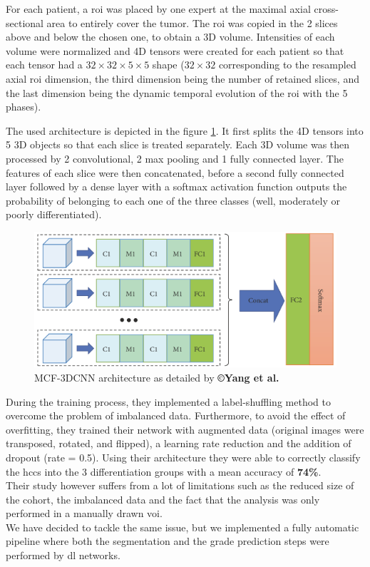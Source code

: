For each patient, a \ac{roi} was placed by one expert at the maximal axial
cross-sectional area to entirely cover the tumor. The \ac{roi} was
copied in the 2 slices above and below the chosen one, to obtain a 3D
volume. Intensities of each volume were normalized and 4D tensors were
created for each patient so that each tensor had a $ 32\times32\times5\times5 $ shape
($ 32\times32 $ corresponding to the resampled axial \ac{roi} dimension, the third
dimension being the number of retained slices, and the last dimension being the
dynamic temporal evolution of the \ac{roi} with the 5 phases).

The used architecture is depicted in the figure \ref{fig:Yang2019_Figure2_MCF-3DCNN}. It first splits the 4D
tensors into 5 3D objects so that each slice is treated separately. Each
3D volume was then processed by 2 convolutional, 2 max pooling and 1
fully connected layer. The features of each slice were then
concatenated, before a second fully connected layer followed by a dense
layer with a softmax activation function outputs the probability of
belonging to each one of the three classes (well, moderately or poorly differentiated).

\begin{figure}[th!]
\centering
\includegraphics[width=0.7\linewidth]{../HistologicalGradePrediction/images/Yang2019_Fig2}
\caption{MCF-3DCNN architecture as detailed by \textbf{©Yang et al. \cite{Yang2019}}}
\label{fig:Yang2019_Figure2_MCF-3DCNN}
\end{figure}


During the training process, they implemented a label-shuffling method
to overcome the problem of imbalanced data. Furthermore, to avoid the
effect of overfitting, they trained their network with augmented data
(original images were transposed, rotated, and flipped), a learning rate
reduction and the addition of dropout (rate = 0.5).
Using their architecture they were able to correctly classify the \ac{hcc}s
into the 3 differentiation groups with a mean accuracy of \textbf{74\%}.\\
Their study however suffers from a lot of limitations such as the
reduced size of the cohort, the imbalanced data and the fact that the
analysis was only performed in a manually drawn \ac{voi}.\\
We have decided to tackle the same issue, but we implemented a fully
automatic pipeline where both the segmentation and the grade prediction
steps were performed by \ac{dl} networks.


